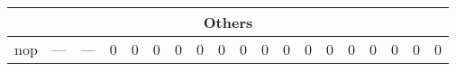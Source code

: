 \documentclass[a4paper,10pt]{article}
\begin{document}
\begin{landscape}
\begin{longtable}[c]{|c|c|@{}c@{}|@{}c@{}|@{}c@{}|@{}c@{}|@{}c@{}|@{}c@{}|@{}c@{}|@{}c@{}|@{}c@{}|@{}c@{}|@{}c@{}|@{}c@{}|@{}c@{}|@{}c@{}|@{}c@{}|@{}c@{}|@{}c@{}|@{}c@{}|@{}c@{}|@{}c@{}|@{}c@{}|@{}c@{}|@{}c@{}|@{}c@{}|}
\hline
\multicolumn{26}{|c|}{Others}                                                                                                                                                                                                                                                                    \\\hline
nop                   &                   ---                                               & \multicolumn{8}{c|}{---}                                   & 0      & 0    & 0    & 0   & 0    & 0  & 0  & 0  & 0                & 0              & 0 & 0 & 0 & 0 & 0 & 0\\\hline
\end{longtable}
\end{landscape}
\end{document}
